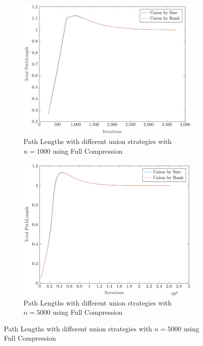 \begin{figure}[ht]
    \centering
    \begin{subfigure}{0.32\textwidth}
        \centering
        \includegraphics[width=\textwidth]{../images/plotFCNonFull1000_PathLength.pdf}
        \caption{Path Lengths with different union strategies with $n = 1000$ using Full Compression}
    \end{subfigure}%
    \hfill
    \begin{subfigure}{0.32\textwidth}
        \centering
        \includegraphics[width=\textwidth]{../images/plotFCNonFull5000_PathLength.pdf}
        \caption{Path Lengths with different union strategies with $n = 5000$ using Full Compression}

\end{subfigure}
\end{figure}
